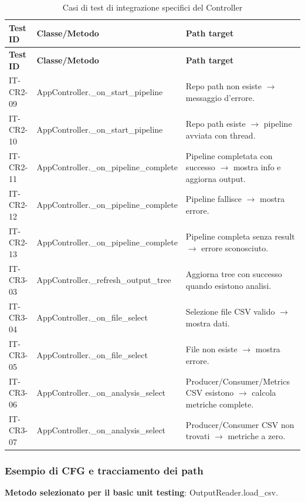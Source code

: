 \documentclass[11pt,a4paper]{article}
\makeatletter
\newif\ifmark@prevlower
\def\mark@casebreak#1{%
  \ifcat\noexpand#1\relax
    \mark@prevlowerfalse
  \else
    \ifnum`#1=\uccode`#1\relax
      \ifmark@prevlower\allowbreak\fi
      \mark@prevlowerfalse
    \else
      \ifnum`#1=\lccode`#1\relax
        \mark@prevlowertrue
      \else
        \mark@prevlowerfalse
      \fi
    \fi
  \fi}
\def\mark@brk#1{%
  \ifx#1\mark@stop
    \let\mark@next\relax
  \else
    \mark@casebreak{#1}%
    #1%
    \ifx#1.\allowbreak\else
      \ifx#1\_\allowbreak\else
        \ifx#1/\allowbreak\else
          \ifx#1(\allowbreak\fi
        \fi
      \fi
    \fi
    \let\mark@next\mark@brk
  \fi
  \mark@next}
\def\mark@stop{\mark@stop}
\DeclareRobustCommand{\mark@code}[1]{%
  \ifmmode
    \text{\ttfamily\small\mark@prevlowerfalse\mark@brk#1\mark@stop}%
  \else
    {\ttfamily\small\mark@prevlowerfalse\mark@brk#1\mark@stop}%
  \fi}
\DeclareRobustCommand{\meth}[1]{\mark@code{#1}}
\def\mark@code#1{#1}%
\def\meth#1{#1}%
\newcommand{\thead}[1]{\textbf{#1}}
\makeatother
\begin{document}
\begin{longtable}{@{}L{2.5cm} L{5.2cm} L{7.2cm}@{}}
  \caption{Casi di test di integrazione specifici del Controller}
  \label{tab:it}\\
  \toprule
  \thead{Test ID} & \thead{Classe/Metodo} & \thead{Path target}\\
  \midrule
  \endfirsthead
  \toprule
  \thead{Test ID} & \thead{Classe/Metodo} & \thead{Path target}\\
  \midrule
  \endhead
  \bottomrule
  \endfoot
  IT-CR2-09 & \meth{AppController.\_on\_start\_pipeline} &
    Repo path non esiste $\rightarrow$ messaggio d'errore.\\
  IT-CR2-10 & \meth{AppController.\_on\_start\_pipeline} &
    Repo path esiste $\rightarrow$ pipeline avviata con thread.\\
  IT-CR2-11 & \meth{AppController.\_on\_pipeline\_complete} &
    Pipeline completata con successo $\rightarrow$ mostra info e aggiorna output.\\
  IT-CR2-12 & \meth{AppController.\_on\_pipeline\_complete} &
    Pipeline fallisce $\rightarrow$ mostra errore.\\
  IT-CR2-13 & \meth{AppController.\_on\_pipeline\_complete} &
    Pipeline completa senza result $\rightarrow$ errore sconosciuto.\\
  IT-CR3-03 & \meth{AppController.\_refresh\_output\_tree} &
    Aggiorna tree con successo quando esistono analisi.\\
  IT-CR3-04 & \meth{AppController.\_on\_file\_select} &
    Selezione file CSV valido $\rightarrow$ mostra dati.\\
  IT-CR3-05 & \meth{AppController.\_on\_file\_select} &
    File non esiste $\rightarrow$ mostra errore.\\
  IT-CR3-06 & \meth{AppController.\_on\_analysis\_select} &
    Producer/Consumer/Metrics CSV esistono $\rightarrow$ calcola metriche complete.\\
  IT-CR3-07 & \meth{AppController.\_on\_analysis\_select} &
    Producer/Consumer CSV non trovati $\rightarrow$ metriche a zero.\\
\end{longtable}

\subsubsection{Esempio di CFG e tracciamento dei path}
\label{sec:cfg}

\textbf{Metodo selezionato per il basic unit testing}:
\meth{OutputReader.load\_csv}.
\end{document}
